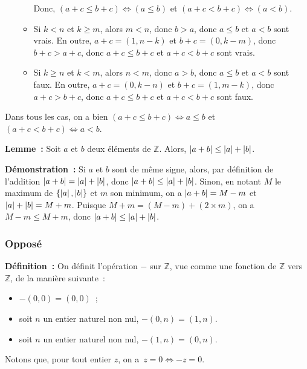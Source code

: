 \begin{itemize}[nosep]
\begin{itemize}[nosep]
                    Donc, $(a+c \leq b+c) \Leftrightarrow (a \leq b)$ et $(a+c < b+c) \Leftrightarrow (a < b)$. 
                \item Si $k < n$ et $k \geq m$, alors $m < n$, donc $b > a$, donc $a \leq b$ et $a < b$ sont vrais.
                    En outre, $a+c = (1, n-k)$ et $b + c = (0, k-m)$, donc $b+c > a+c$, donc $a+c \leq b+c$ et $a+c < b+c$ sont vrais.
                \item Si $k \geq n$ et $k < m$, alors $n < m$, donc $a > b$, donc $a \leq b$ et $a < b$ sont faux.
                    En outre, $a+c = (0, k-n)$ et $b + c = (1, m-k)$, donc $a+c > b+c$, donc $a+c \leq b+c$ et $a+c < b+c$ sont faux.
            \end{itemize}
    \end{itemize}
    Dans tous les cas, on a bien $(a+c \leq b+c) \Leftrightarrow a \leq b$ et $(a+c < b+c) \Leftrightarrow a < b$.
    
    \done

\medskip

\noindent\textbf{Lemme :} Soit $a$ et $b$ deux éléments de $\mathbb{Z}$.
    Alors, $\left\lvert a + b \right\rvert \leq \left\lvert a \right\rvert + \left\lvert b \right\rvert$.

\medskip

\noindent\textbf{Démonstration :} Si $a$ et $b$ sont de même signe, alors, par définition de l'addition $\left\lvert a + b \right\rvert = \left\lvert a \right\rvert + \left\lvert b \right\rvert$, donc $\left\lvert a + b \right\rvert \leq \left\lvert a \right\rvert + \left\lvert b \right\rvert$.
    Sinon, en notant $M$ le maximum de $\lbrace \left\lvert a \right\rvert, \left\lvert b \right\rvert \rbrace$ et $m$ son minimum, on a $\left\lvert a + b \right\rvert = M - m$ et $\left\lvert a \right\rvert + \left\lvert b \right\rvert= M + m$.
    Puisque $M + m = (M - m) + (2 \times m)$, on a $M - m \leq M + m$, donc $\left\lvert a + b \right\rvert \leq \left\lvert a \right\rvert + \left\lvert b \right\rvert$.
    
    \done

\subsubsection{Opposé}

\noindent\textbf{Définition :} On définit l'opération $-$ sur $\mathbb{Z}$, vue comme une fonction de $\mathbb{Z}$ vers $\mathbb{Z}$, de la manière suivante : 
\begin{itemize}[nosep]
    \item $-(0,0) = (0,0)$ ;
    \item soit $n$ un entier naturel non nul, $-(0,n) = (1,n)$.
    \item soit $n$ un entier naturel non nul, $-(1,n) = (0,n)$.
\end{itemize}
Notons que, pour tout entier $z$, on a $z = 0 \Leftrightarrow -z = 0$.

